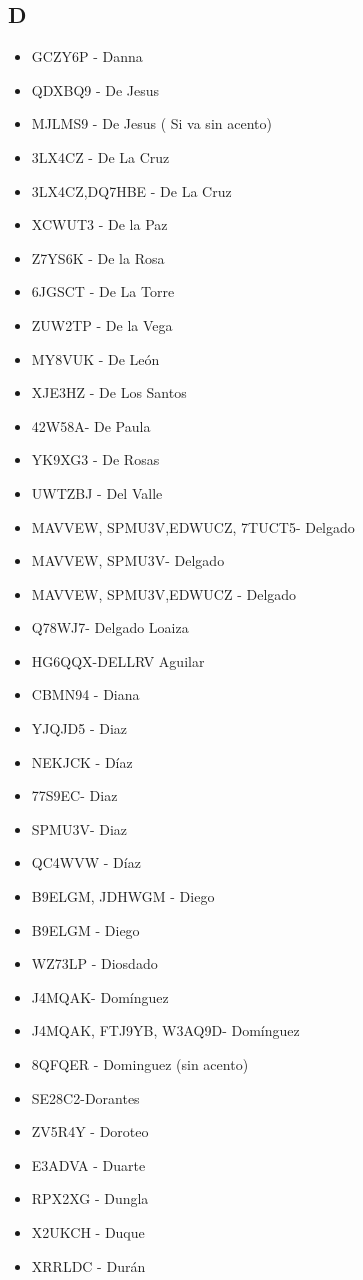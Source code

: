 \subsection*{D}
\begin{itemize}[leftmargin=*,nosep]
\item GCZY6P  -  Danna
\item QDXBQ9 - De Jesus
\item MJLMS9 - De Jesus ( Si va sin acento)
\item 3LX4CZ -  De La Cruz
\item 3LX4CZ,DQ7HBE - De La Cruz
\item XCWUT3 - De la Paz
\item Z7YS6K - De la Rosa
\item 6JGSCT - De La Torre
\item ZUW2TP - De la Vega
\item MY8VUK - De León
\item XJE3HZ - De Los Santos
\item 42W58A- De Paula
\item YK9XG3 - De Rosas
\item UWTZBJ - Del Valle
\item MAVVEW, SPMU3V,EDWUCZ, 7TUCT5- Delgado
\item MAVVEW, SPMU3V- Delgado
\item MAVVEW, SPMU3V,EDWUCZ - Delgado
\item Q78WJ7- Delgado Loaiza
\item HG6QQX-DELLRV Aguilar
\item CBMN94  -  Diana
\item YJQJD5 -  Diaz
\item NEKJCK  -  Díaz
\item 77S9EC- Diaz
\item SPMU3V- Diaz
\item QC4WVW - Díaz
\item B9ELGM, JDHWGM - Diego
\item B9ELGM - Diego
\item WZ73LP - Diosdado
\item J4MQAK- Domínguez
\item J4MQAK, FTJ9YB, W3AQ9D- Domínguez
\item 8QFQER - Dominguez (sin acento)
\item SE28C2-Dorantes
\item ZV5R4Y - Doroteo
\item E3ADVA - Duarte
\item RPX2XG - Dungla
\item X2UKCH - Duque
\item XRRLDC - Durán
\end{itemize}

